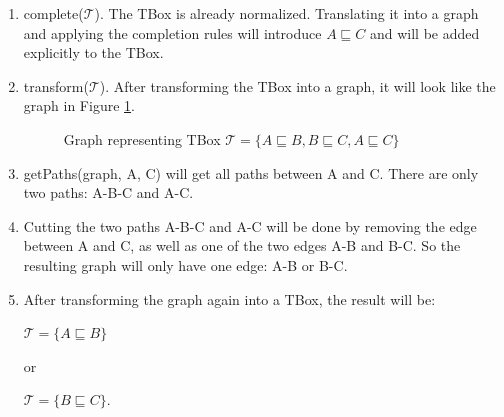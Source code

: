 \begin{enumerate}
\item complete($\mathcal{T}$). 
The TBox is already normalized. Translating it into a graph and applying the completion rules will introduce $A \sqsubseteq C$ and will be added explicitly to the TBox.
\item transform($\mathcal{T}$).
After transforming the TBox into a graph, it will look like the graph in Figure \ref{abc-kb}.

\begin{figure}
\centering
{}
\caption{Graph representing TBox $\mathcal{T} = \lbrace A \sqsubseteq B, B \sqsubseteq C, A \sqsubseteq C \rbrace $}
\label{abc-kb}
\end{figure}

\item getPaths(graph, A, C) will get all paths between A and C. There are only two paths: A-B-C and A-C. 

\item Cutting the two paths A-B-C and A-C will be done by removing the edge between A and C, as well as one of the two edges A-B and B-C. So the resulting graph will only have one edge: A-B or B-C.

\item After transforming the graph again into a TBox, the result will be:
\begin{center}
$\mathcal{T} = \lbrace A \sqsubseteq B \rbrace$
\end{center}
or 
\begin{center}
$\mathcal{T} = \lbrace B \sqsubseteq C \rbrace$.
\end{center}

\end{enumerate}


